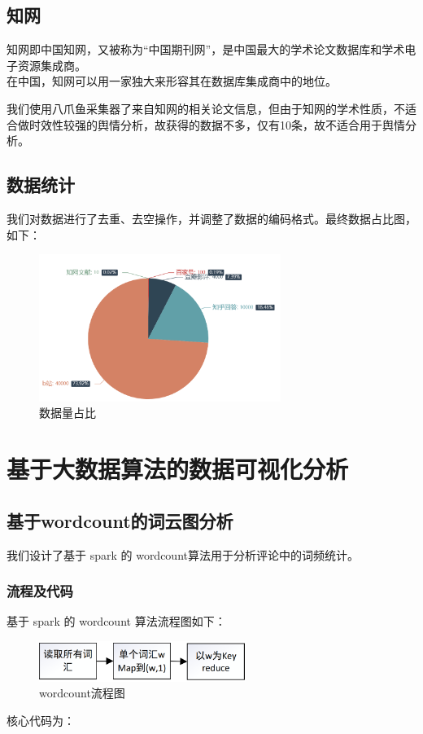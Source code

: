 \documentclass[12pt,a4paper,utf8]{article}
\begin{document}
\subsection{知网}
知网即中国知网，又被称为“中国期刊网”，是中国最大的学术论文数据库和学术电子资源集成商。\\

在中国，知网可以用一家独大来形容其在数据库集成商中的地位。

我们使用八爪鱼采集器了来自知网的相关论文信息，但由于知网的学术性质，不适合做时效性较强的舆情分析，故获得的数据不多，仅有10条，故不适合用于舆情分析。 \\

\subsection{数据统计}
我们对数据进行了去重、去空操作，并调整了数据的编码格式。最终数据占比图，如下：
\begin{figure}[H]
    \centering
    \includegraphics[width=0.7\textwidth]{images/数据量占比.png}  
    \caption{数据量占比} 
\end{figure}   


\section{基于大数据算法的数据可视化分析}
\subsection{基于wordcount的词云图分析}
我们设计了基于 spark 的 wordcount算法用于分析评论中的词频统计。

\subsubsection{流程及代码}
基于 spark 的 wordcount 算法流程图如下：
\begin{figure}[H]
    \centering
    \includegraphics[width=0.6\textwidth]{images/wordcount.png}  
    \caption{wordcount流程图} 
\end{figure}  
核心代码为：
 
\end{document}
